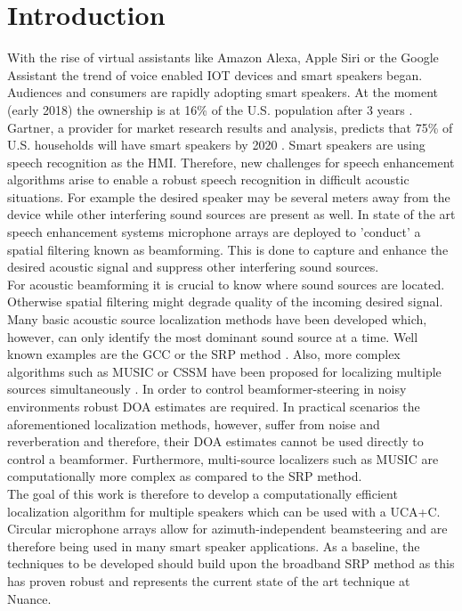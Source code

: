 \chapter{Introduction}
\label{chap:introduction}

With the rise of virtual assistants like Amazon Alexa, Apple Siri or the Google Assistant the trend of voice enabled \ac{IOT} devices and smart speakers began. Audiences and consumers are rapidly adopting smart speakers. At the moment (early 2018) the ownership is at 16\% of the U.S. population after 3 years \cite{smartreport}. Gartner, a provider for market research results and analysis, predicts that 75\% of U.S. households will have smart speakers by 2020 \cite{gartner}. Smart speakers are using speech recognition as the \ac{HMI}. Therefore, new challenges for speech enhancement algorithms arise to enable a robust speech recognition in difficult acoustic situations. For example the desired speaker may be several meters away from the device while other interfering sound sources are present as well. In state of the art speech enhancement systems microphone arrays are deployed to 'conduct' a spatial filtering known as beamforming. This is done to capture and enhance the desired acoustic signal and suppress other interfering sound sources.\\

For acoustic beamforming it is crucial to know where sound sources are located. Otherwise spatial filtering might degrade quality of the incoming desired signal. Many basic acoustic source localization methods have been developed which, however, can only identify the most dominant sound source at a time. Well known examples are the \ac{GCC} or the \ac{SRP} method \cite[Chapter~8]{brandstein2013microphone}. Also, more complex algorithms such as \ac{MUSIC} or \ac{CSSM} have been proposed for localizing multiple sources simultaneously \cite{krolik1989multiple,1164667}. In order to control beamformer-steering in noisy environments robust \ac{DOA} estimates are required. In practical scenarios the aforementioned localization methods, however, suffer from noise and reverberation and therefore, their \ac{DOA} estimates cannot be used directly to control a beamformer. Furthermore, multi-source localizers such as \ac{MUSIC} are computationally more complex as compared to the \ac{SRP} method. \\

The goal of this work is therefore to develop a computationally efficient localization algorithm for multiple speakers which can be used with a \ac{UCA+C}. Circular microphone arrays allow for azimuth-independent beamsteering and are therefore being used in many smart speaker applications. As a baseline, the techniques to be developed should build upon the broadband \ac{SRP} method as this has proven robust and represents the current state of the art technique at Nuance. \\

